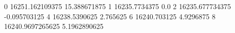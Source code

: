 0 16251.162109375 15.388671875
1 16235.7734375 0.0
2 16235.677734375 -0.095703125
4 16238.5390625 2.765625
6 16240.703125 4.9296875
8 16240.9697265625 5.1962890625
